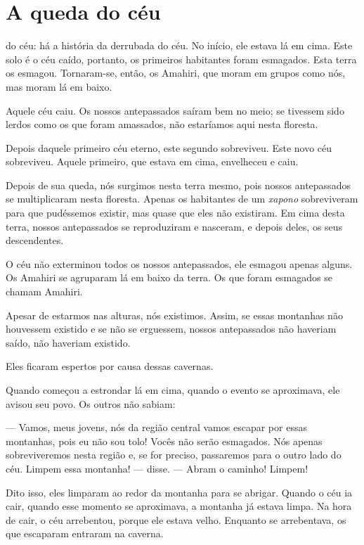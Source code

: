 \chapter{A queda do céu}

 do céu: há a história da derrubada do céu. No início, ele
estava lá em cima. Este solo é o céu caído, portanto, os primeiros
habitantes foram esmagados. Esta terra os esmagou. Tornaram-se, então,
os Amahiri, que moram em grupos como nós, mas moram lá em baixo. 

Aquele céu caiu. Os nossos antepassados saíram bem no meio; se tivessem
sido lerdos como os que foram amassados, não estaríamos aqui nesta
floresta. 

Depois daquele primeiro céu eterno, este segundo sobreviveu. Este novo
céu sobreviveu. Aquele primeiro, que estava em cima, envelheceu e caiu. 

Depois de sua queda, nós surgimos nesta terra mesmo, pois nossos
antepassados se multiplicaram nesta floresta. Apenas os habitantes de um
\textit{xapono} sobreviveram para que pudéssemos existir, mas quase que eles não
existiram. Em cima desta terra, nossos antepassados se reproduziram e
nasceram, e depois deles, os seus descendentes. 

O céu não exterminou todos os nossos antepassados, ele esmagou apenas alguns. Os
Amahiri se agruparam lá em baixo da terra. Os que foram esmagados se
chamam Amahiri. 

Apesar de estarmos nas alturas, nós existimos. Assim, se essas montanhas
não houvessem existido e se não se erguessem, nossos antepassados não
haveriam saído, não haveriam existido. 

Eles ficaram espertos por causa dessas cavernas.

Quando começou a estrondar lá em cima, quando o evento se
aproximava, ele avisou seu povo. Os outros não sabiam:

--- Vamos, meus jovens, nós da região central vamos escapar por essas
montanhas, pois eu não sou tolo! Vocês não serão esmagados. Nós apenas
sobreviveremos nesta região e, se for preciso, passaremos para o outro lado
do céu. Limpem essa montanha! --- disse. --- Abram o caminho! Limpem! 

Dito isso, eles limparam ao redor da montanha para se abrigar. Quando o
céu ia cair, quando esse momento se aproximava, a montanha já estava
limpa. Na hora de cair, o céu arrebentou, porque ele estava velho.
Enquanto se arrebentava, os que escaparam entraram na caverna. 

